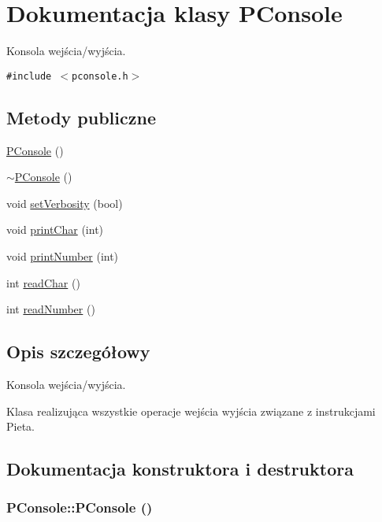\hypertarget{classPConsole}{
\section{Dokumentacja klasy PConsole}
\label{classPConsole}
}
Konsola wejścia/wyjścia.  


{\tt \#include $<$pconsole.h$>$}

\subsection*{Metody publiczne}
\begin{CompactItemize}
\item 
\hyperlink{classPConsole_c783e5f2b3c5a0bbde30171ab1226be4}{PConsole} ()
\item 
\hyperlink{classPConsole_c4a28c9ee5bfd46977b4339672212aca}{$\sim$PConsole} ()
\item 
void \hyperlink{classPConsole_b5446c4f888fe9552788a2e757f23b6b}{setVerbosity} (bool)
\item 
void \hyperlink{classPConsole_1c0c7c5be680cdb2e456e3e34798c7a6}{printChar} (int)
\item 
void \hyperlink{classPConsole_744226ceb9724625cadf1124a2b87f55}{printNumber} (int)
\item 
int \hyperlink{classPConsole_5bf368ed172de8c7e8221973b3c613c3}{readChar} ()
\item 
int \hyperlink{classPConsole_fbe2b8e906db6d9fc70397d8a9b4105c}{readNumber} ()
\end{CompactItemize}


\subsection{Opis szczegółowy}
Konsola wejścia/wyjścia. 

Klasa realizująca wszystkie operacje wejścia wyjścia związane z instrukcjami Pieta. 

\subsection{Dokumentacja konstruktora i destruktora}
\hypertarget{classPConsole_c783e5f2b3c5a0bbde30171ab1226be4}{
\subsubsection[{PConsole}]{\setlength{\rightskip}{0pt plus 5cm}PConsole::PConsole ()}}
\label{classPConsole_c783e5f2b3c5a0bbde30171ab1226be4}


